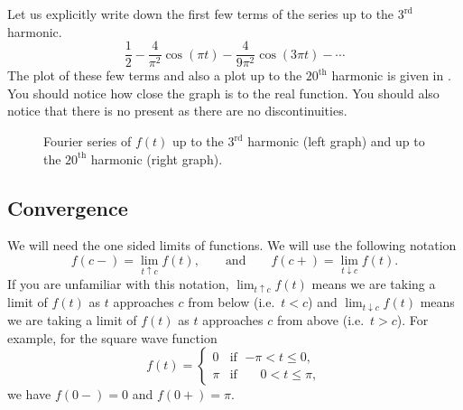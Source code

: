 \documentclass[12pt]{book}
\begin{document}
\begin{example}
Let us explicitly write down the first few terms of the series
up to the $3^{\text{rd}}$ harmonic.
\begin{equation*}
\frac{1}{2} -
\frac{4}{\pi^2} \cos (\pi t)
-
\frac{4}{9 \pi^2} \cos (3 \pi t)
- \cdots
\end{equation*}
The plot of these few terms and also a plot up to the ${20}^{\text{th}}$
harmonic is given in
.  You should notice how close the graph is
to the real function.  You should also notice that there is no
 present as there are no discontinuities.

\begin{figure}[h!t]
\capstart
\begin{center}
\quad
{}
\caption{Fourier series of $f(t)$ up to the $3^{\text{rd}}$ harmonic (left
graph)
and up to the ${20}^{\text{th}}$ harmonic (right graph).\label{gfs:sawcontfsfig}}
\end{center}
\end{figure}
\end{example}

\subsection{Convergence}

We will need the one sided limits of functions.
We will use the following notation
\begin{equation*}
f(c-) = \lim_{t \uparrow c} f(t),
\qquad \text{and} \qquad
f(c+) = \lim_{t \downarrow c} f(t).
\end{equation*}
If you are unfamiliar with this notation,
$\lim_{t \uparrow c} f(t)$ means we are taking a limit of $f(t)$
as $t$ approaches $c$ from below (i.e.\ $t < c$) and
$\lim_{t \downarrow c} f(t)$ means we are taking a limit of $f(t)$
as $t$ approaches $c$ from above (i.e.\ $t > c$).
For example, for the square wave function
\begin{equation} \label{gfs:sqwaveeq}
f(t) =
\begin{cases}
0 & \text{if } \; {-\pi} < t \leq 0 , \\
\pi & \text{if } \; \phantom{-}0 < t \leq \pi ,
\end{cases}
\end{equation}
we have $f(0-) = 0$ and $f(0+) = \pi$.
\end{document}
